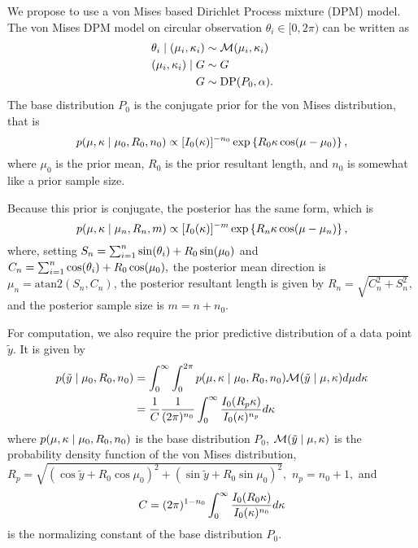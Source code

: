 We propose to use a von Mises based Dirichlet Process mixture (DPM) model. The von Mises DPM model on circular observation $\theta_i \in [0, 2\pi)$ can be written as
\begin{align}
\theta_i \mid (\mu_i, \kappa_i) &\sim \mathcal{M}(\mu_i, \kappa_i) \\
(\mu_i, \kappa_i) \mid G  &\sim G \\
G &\sim \text{DP}(P_0, \alpha).
\end{align}
The base distribution $P_0$ is the conjugate prior for the von Mises distribution, that is
\begin{equation}
p(\mu, \kappa \mid \mu_0, R_0, n_0) \propto [I_0(\kappa)]^{-n_0} \exp\left\{ R_0 \kappa \cos(\mu - \mu_0)\right\},
\end{equation}
where $\mu_0$ is the prior mean, $R_0$ is the prior resultant length, and $n_0$ is somewhat like a prior sample size.

Because this prior is conjugate, the posterior has the same form, which is
\begin{equation}
p(\mu, \kappa \mid \mu_n, R_n, m) \propto [I_0(\kappa)]^{-m} \exp\left\{ R_n \kappa \cos(\mu - \mu_n)\right\},
\end{equation}
where, setting $S_n = \sum_{i = 1}^n \sin(\theta_i) + R_0 \sin(\mu_0)$ and $C_n =  \sum_{i = 1}^n \cos(\theta_i) + R_0 \cos(\mu_0),$  the posterior mean direction is $\mu_n = \text{atan2} \left(S_n, C_n\right)$, the posterior resultant length is given by $R_n = \sqrt{C_n^2 + S_n^2},$ and the posterior sample size is $m = n + n_0$.

For computation, we also require the prior predictive distribution of a data point $\tilde{y}$.  It is given by
\begin{align}
p(\tilde{y}\mid \mu_0, R_0, n_0) &= \int_{0}^\infty \int_0^{2\pi} p(\mu, \kappa \mid \mu_0, R_0, n_0) \mathcal{M}(\tilde{y} \mid \mu, \kappa) d\mu d\kappa \\
&= \frac{1}{C}  \frac{1}{(2\pi)^{n_0}} \int_{0}^\infty \frac{I_0(R_p\kappa)}{I_0(\kappa)^{n_p}} d\kappa
\end{align}
where $p(\mu, \kappa \mid \mu_0, R_0, n_0)$ is the base distribution $P_0$, $ \mathcal{M}(\tilde{y} \mid \mu, \kappa)$ is the probability density function of the von Mises distribution, $R_p = \sqrt{\left(\cos{\tilde{y}} + R_0 \cos \mu_0 \right)^2 + \left(\sin{\tilde{y}} + R_0 \sin \mu_0 \right)^2},$ $n_p = n_0 + 1,$ and
\begin{equation}
C = (2\pi)^{1 - n_0} \int_{0}^\infty \frac{I_0(R_0\kappa)}{I_0(\kappa)^{n_0}} d\kappa
\end{equation}
is the normalizing constant of the base distribution $P_0$.

